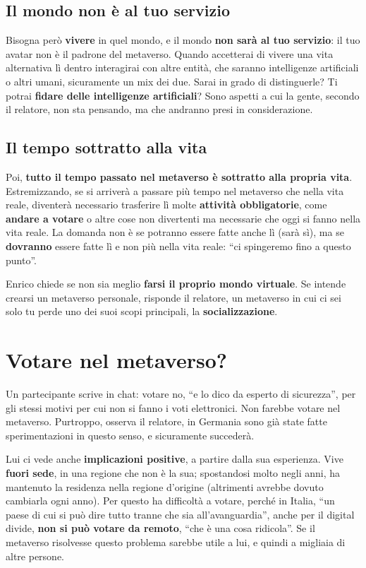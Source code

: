 \subsection{Il mondo non è al tuo servizio}

Bisogna però \textbf{vivere} in quel mondo, e il mondo \textbf{non sarà al tuo
servizio}: il tuo avatar non è il padrone del metaverso. Quando accetterai di
vivere una vita alternativa lì dentro interagirai con altre entità, che saranno
intelligenze artificiali o altri umani, sicuramente un mix dei due. Sarai in
grado di distinguerle? Ti potrai \textbf{fidare delle intelligenze
artificiali}? Sono aspetti a cui la gente, secondo il relatore, non sta pensando,
ma che andranno presi in considerazione.

\subsection{Il tempo sottratto alla vita}

Poi, \textbf{tutto il tempo passato nel metaverso è sottratto alla propria vita}.
Estremizzando, se si arriverà a passare più tempo nel metaverso che nella vita
reale, diventerà necessario trasferire lì molte \textbf{attività obbligatorie},
come \textbf{andare a votare} o altre cose non divertenti ma necessarie che oggi
si fanno nella vita reale. La domanda non è se potranno essere fatte anche lì
(sarà sì), ma se \textbf{dovranno} essere fatte lì e non più nella vita reale:
``ci spingeremo fino a questo punto''.

Enrico chiede se non sia meglio \textbf{farsi il proprio mondo virtuale}. Se
intende crearsi un metaverso personale, risponde il relatore, un metaverso in cui
ci sei solo tu perde uno dei suoi scopi principali, la \textbf{socializzazione}.

\section{Votare nel metaverso?}
\label{z8:sec:voto}

Un partecipante scrive in chat: votare no, ``e lo dico da esperto di
sicurezza'', per gli stessi motivi per cui non si fanno i voti elettronici. Non
farebbe votare nel metaverso. Purtroppo, osserva il relatore, in Germania sono
già state fatte sperimentazioni in questo senso, e sicuramente succederà.

Lui ci vede anche \textbf{implicazioni positive}, a partire dalla sua esperienza.
Vive \textbf{fuori sede}, in una regione che non è la sua; spostandosi molto
negli anni, ha mantenuto la residenza nella regione d'origine (altrimenti avrebbe
dovuto cambiarla ogni anno). Per questo ha difficoltà a votare, perché in Italia,
``un paese di cui si può dire tutto tranne che sia all'avanguardia'', anche per
il digital divide, \textbf{non si può votare da remoto}, ``che è una cosa
ridicola''. Se il metaverso risolvesse questo problema sarebbe utile a lui, e
quindi a migliaia di altre persone.


